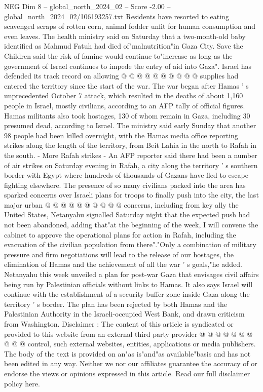 \begin{textsample}{NEG Dim 8 – global\_north\_2024\_02 – Score -2.00 – global\_north\_2024\_02/106193257.txt}
Residents have resorted to eating scavenged scraps of rotten corn, animal fodder unfit for human consumption and even leaves.
The health ministry said on Saturday that a two-month-old baby identified as Mahmud Fatuh had died of"malnutrition"in Gaza City.
Save the Children said the risk of famine would continue to"increase as long as the government of Israel continues to impede the entry of aid into Gaza".
Israel has defended its track record on allowing @ @ @ @ @ @ @ @ @ @ supplies had entered the territory since the start of the war.
The war began after Hamas ' s unprecedented October 7 attack, which resulted in the deaths of about 1,160 people in Israel, mostly civilians, according to an AFP tally of official figures.
Hamas militants also took hostages, 130 of whom remain in Gaza, including 30 presumed dead, according to Israel.
The ministry said early Sunday that another 98 people had been killed overnight, with the Hamas media office reporting strikes along the length of the territory, from Beit Lahia in the north to Rafah in the south. - More Rafah strikes - An AFP reporter said there had been a number of air strikes on Saturday evening in Rafah, a city along the territory ' s southern border with Egypt where hundreds of thousands of Gazans have fled to escape fighting elsewhere.
The presence of so many civilians packed into the area has sparked concerns over Israeli plans for troops to finally push into the city, the last major urban @ @ @ @ @ @ @ @ @ @ concerns, including from key ally the United States, Netanyahu signalled Saturday night that the expected push had not been abandoned, adding that"at the beginning of the week, I will convene the cabinet to approve the operational plans for action in Rafah, including the evacuation of the civilian population from there"."Only a combination of military pressure and firm negotiations will lead to the release of our hostages, the elimination of Hamas and the achievement of all the war ' s goals,"he added.
Netanyahu this week unveiled a plan for post-war Gaza that envisages civil affairs being run by Palestinian officials without links to Hamas.
It also says Israel will continue with the establishment of a security buffer zone inside Gaza along the territory ' s border.
The plan has been rejected by both Hamas and the Palestinian Authority in the Israeli-occupied West Bank, and drawn criticism from Washington.
Disclaimer : The content of this article is syndicated or provided to this website from an external third party provider @ @ @ @ @ @ @ @ @ @ control, such external websites, entities, applications or media publishers.
The body of the text is provided on an"as is"and"as available"basis and has not been edited in any way.
Neither we nor our affiliates guarantee the accuracy of or endorse the views or opinions expressed in this article.
Read our full disclaimer policy here.

\end{textsample}
